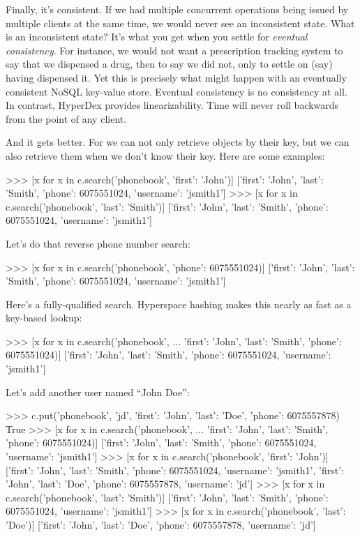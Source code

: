 Finally, it's consistent. If we had multiple concurrent  operations
being issued by multiple clients at the same time, we would never see an
inconsistent state.  What is an inconsistent state?  It's what you get when you
settle for {\em eventual consistency}.  For instance, we would not want a
prescription tracking system to say that we dispensed a drug, then to say we did
not, only to settle on (say) having dispensed it. Yet this is precisely what
might happen with an eventually consistent NoSQL key-value store.  Eventual
consistency is no consistency at all.  In contrast, HyperDex provides
linearizability. Time will never roll backwards from the point of any client.

And it gets better. For we can not only retrieve objects by their key, but we
can also retrieve them when we don't know their key. Here are some examples:

\begin{pythoncode}
>>> [x for x in c.search('phonebook', {'first': 'John'})]
[{'first': 'John',
  'last': 'Smith',
  'phone': 6075551024,
  'username': 'jsmith1'}]
>>> [x for x in c.search('phonebook', {'last': 'Smith'})]
[{'first': 'John',
  'last': 'Smith',
  'phone': 6075551024,
  'username': 'jsmith1'}]
\end{pythoncode}

Let's do that reverse phone number search:

\begin{pythoncode}
>>> [x for x in c.search('phonebook', {'phone': 6075551024})]
[{'first': 'John',
  'last': 'Smith',
  'phone': 6075551024,
  'username': 'jsmith1'}]
\end{pythoncode}

Here's a fully-qualified search. Hyperspace hashing makes this nearly as fast as
a key-based lookup:

\begin{pythoncode}
>>> [x for x in c.search('phonebook',
...  {'first': 'John', 'last': 'Smith', 'phone': 6075551024})]
[{'first': 'John',
  'last': 'Smith',
  'phone': 6075551024,
  'username': 'jsmith1'}]
\end{pythoncode}

Let's add another user named ``John Doe'':

\begin{pythoncode}
>>> c.put('phonebook', 'jd', {'first': 'John', 'last': 'Doe', 'phone': 6075557878})
True
>>> [x for x in c.search('phonebook',
...  {'first': 'John', 'last': 'Smith', 'phone': 6075551024})]
[{'first': 'John',
  'last': 'Smith',
  'phone': 6075551024,
  'username': 'jsmith1'}]
>>> [x for x in c.search('phonebook', {'first': 'John'})]
[{'first': 'John',
  'last': 'Smith',
  'phone': 6075551024,
  'username': 'jsmith1'},
 {'first': 'John',
  'last': 'Doe',
  'phone': 6075557878,
  'username': 'jd'}]
>>> [x for x in c.search('phonebook', {'last': 'Smith'})]
[{'first': 'John',
  'last': 'Smith',
  'phone': 6075551024,
  'username': 'jsmith1'}]
>>> [x for x in c.search('phonebook', {'last': 'Doe'})]
[{'first': 'John',
  'last': 'Doe',
  'phone': 6075557878,
  'username': 'jd'}]
\end{pythoncode}

